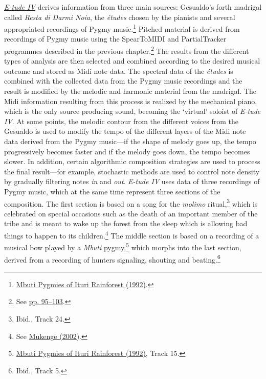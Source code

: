 \href{http://www.federicoreuben.com/media/audio/mp3/CompositionsPhD/04%20E-tude%20IV.mp3}{\emph{E-tude IV}} derives information from three main sources: Gesualdo's forth madrigal called \emph{Resta di Darmi Noia}, the \emph{\'{e}tudes} chosen by the pianists and several appropriated recordings of Pygmy music.\footnote{\hyperlink{pygmy}{Mbuti Pygmies of Ituri Rainforest (1992)}.} Pitched material is derived from recordings of Pygmy music using the SpearToMIDI and PartialTracker programmes described in the previous chapter.\footnote{See \hyperlink{spectrack}{pp. 95--103}.} The results from the different types of analysis are then selected and combined according to the desired musical outcome and stored as Midi note data. The spectral data of the \emph{\'{e}tudes} is combined with the collected data from the Pygmy music recordings and the result is modified by the melodic and harmonic material from the madrigal. The Midi information resulting from this process is realized by the mechanical piano, which is the only source producing sound, becoming the `virtual' soloist of \emph{E-tude IV}. At some points, the melodic contour from the different voices from the Gesualdo is used to modify the tempo of the different layers of the Midi note data derived from the Pygmy music---if the shape of melody goes up, the tempo progressively becomes faster and if the melody goes down, the tempo becomes slower. In addition, certain algorithmic composition strategies are used to process the final result---for example, stochastic methods are used to control note density by gradually filtering notes \emph{in} and \emph{out}. \emph{E-tude IV} uses data of three recordings of Pygmy music, which at the same time represent three sections of the composition. The first section is based on a song for the \emph{molimo} ritual,\footnote{Ibid., Track 24.} which is celebrated on special occasions such as the death of an important member of the tribe and is meant to wake up the forest from the sleep which is allowing bad things to happen to its children.\footnote{See \hyperlink{mukenge}{Mukenge (2002)}.} The middle section is based on a recording of a musical bow played by a \emph{Mbuti} pygmy,\footnote{\hyperlink{pygmy}{Mbuti Pygmies of Ituri Rainforest (1992)}, Track 15.} which morphs into the last section, derived from a recording of hunters signaling, shouting and beating.\footnote{Ibid., Track 5.}

